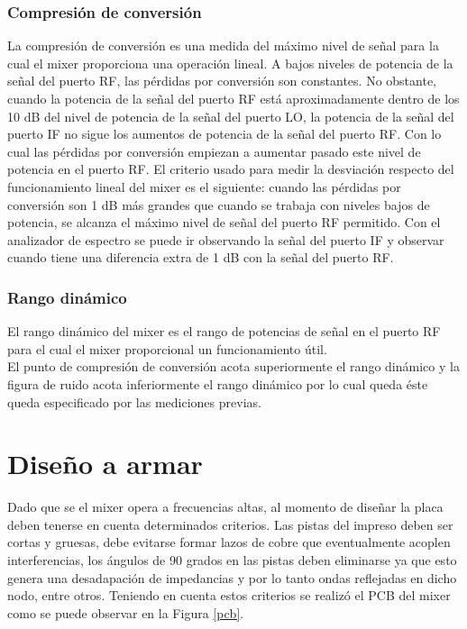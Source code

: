 \documentclass[a4paper,10pt]{article}
\begin{document}
	\subsubsection{Compresi\'on de conversi\'on}
	\indent La compresi\'on de conversi\'on es una medida del m\'aximo nivel de 
	se\~nal para la cual el mixer proporciona una operaci\'on lineal. A bajos 
	niveles de potencia de la se\~nal del puerto RF, las p\'erdidas por 
	conversi\'on son constantes. No obstante, cuando la potencia de la se\~nal 
	del puerto RF est\'a aproximadamente dentro de los 10 dB del nivel de 
	potencia de la se\~nal del puerto LO, la potencia de la se\~nal del puerto 
	IF no sigue los aumentos de potencia de la se\~nal del puerto RF. Con lo 
	cual las p\'erdidas por conversi\'on empiezan a aumentar pasado este nivel 
	de potencia en el puerto RF. El criterio usado para medir la desviaci\'on 
	respecto del funcionamiento lineal del mixer es el siguiente: cuando las 
	p\'erdidas por conversi\'on son 1 dB m\'as grandes que cuando se trabaja con
	niveles bajos de potencia, se alcanza el m\'aximo nivel de se\~nal del 
	puerto RF permitido. Con el analizador de espectro se puede ir observando la
	se\~nal del puerto IF y observar cuando tiene una diferencia extra de 1 dB 
	con la se\~nal del puerto RF. 
		
	\subsubsection{Rango din\'amico}
	\indent	El rango din\'amico del mixer es el rango de potencias de se\~nal en
	el puerto RF para el cual el mixer proporcional un funcionamiento \'util. \\
	\indent	El punto de compresi\'on de conversi\'on acota superiormente el 
	rango din\'amico y la figura de ruido acota inferiormente el rango 
	din\'amico por lo cual queda \'este queda especificado por las mediciones 
	previas.


	\section{Diseño a armar}
	\indent Dado que se el mixer opera a frecuencias altas, al momento de 
	dise\~nar la placa deben tenerse en cuenta determinados criterios. Las 
	pistas del impreso deben ser cortas y gruesas, debe evitarse formar lazos de
	cobre que eventualmente acoplen interferencias, los \'angulos de 90 grados 
	en las pistas deben eliminarse ya que esto genera una desadapaci\'on de 
	impedancias y por lo tanto ondas reflejadas en dicho nodo, entre otros. 
	Teniendo en cuenta estos criterios se realiz\'o el PCB del mixer como se 
	puede observar en la Figura \ref{pcb}. \\
	
\end{document}

